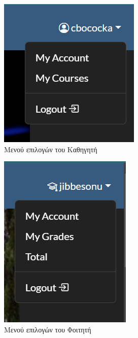 \documentclass[12pt]{article}
\begin{document}
\begin{figure}[H]
	\centering
	\begin{subfigure}{.35\textwidth}
		\centering
		\includegraphics[width=.8\linewidth]{b2.png}
		\caption{Μενού επιλογών του Καθηγητή}
		\label{fig:sub23}
	\end{subfigure}
	\begin{subfigure}{.35\textwidth}
		\centering
		\includegraphics[width=.8\linewidth]{b3.png}
		\caption{Μενού επιλογών του Φοιτητή}
		\label{fig:sub24}
	\end{subfigure}
	\caption{}
	\label{fig:test1}
\end{figure}
\end{document}
